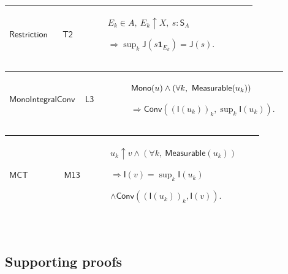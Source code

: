 \documentclass[12pt,reqno]{amsart}
\theoremstyle{blueplain}
\numberwithin{equation}{section}
\begin{document}
{\scriptsize \setlength{\parskip}{0pt}\nointerlineskip
\noindent 
\begin{tabular}{|@{}>{\centering\arraybackslash}m{0.19251\linewidth}|>{\centering\arraybackslash}m{0.16845\linewidth}|>{\centering\arraybackslash}m{0.53904\linewidth}|}
\hline
\hypertarget{lem:Restriction}{$\displaystyle \mathsf{Restriction}$} & 
\hyperlink{proof:T2}{$\displaystyle \mathsf{T2}$} & $\displaystyle E_k\in
A,\ E_k\uparrow X,\ s:\mathsf{S}_A$\par$\displaystyle \Rightarrow\sup_k%
\mathsf{J}(s\mathbf{1}_{E_k})=\mathsf{J}(s).$ \\ \hline
\end{tabular}%
}

{\scriptsize \setlength{\parskip}{0pt}\nointerlineskip
\noindent 
\begin{tabular}{|@{}>{\centering\arraybackslash}m{0.19251\linewidth}|>{\centering\arraybackslash}m{0.16845\linewidth}|>{\centering\arraybackslash}m{0.53904\linewidth}|}
\hline
\hypertarget{lem:MonoIntegralConv}{$\displaystyle \mathsf{MonoIntegralConv}$}
& \hyperlink{proof:L3}{$\displaystyle \mathsf{L3}$} & $\displaystyle \mathsf{%
Mono}(u)\land(\forall k,\ \mathsf{Measurable}(u_k))$\par$\displaystyle %
\Rightarrow\mathsf{Conv}((\mathsf{I}(u_k))_k,\sup_k\mathsf{I}(u_k)).$ \\ 
\hline
\end{tabular}%
}

{\scriptsize \setlength{\parskip}{0pt}\nointerlineskip
\noindent 
\begin{tabular}{|@{}>{\centering\arraybackslash}m{0.19251\linewidth}|>{\centering\arraybackslash}m{0.16845\linewidth}|>{\centering\arraybackslash}m{0.53904\linewidth}|}
\hline
\hypertarget{lem:MCT}{$\displaystyle \mathsf{MCT}$} & \hyperlink{proof:M13}{$%
\displaystyle \mathsf{M13}$} & $\displaystyle u_k\uparrow v\land(\forall k,\ 
\mathsf{Measurable}(u_k))$\par$\displaystyle \Rightarrow\mathsf{I}(v)=\sup_k%
\mathsf{I}(u_k)$\par$\displaystyle \land\mathsf{Conv}((\mathsf{I}(u_k))_k,%
\mathsf{I}(v)).$ \\ \hline
\end{tabular}%
}

{\scriptsize \ }

\subsection{\protect\scriptsize Supporting proofs}
\end{document}
